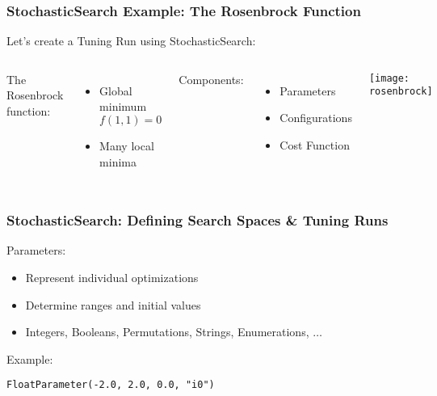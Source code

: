 \documentclass[10pt, compress, aspectratio=169, xcolor=table]{beamer}
\begin{document}
\begin{frame}
    \frametitle{StochasticSearch Example: The Rosenbrock Function}
    Let's create a \alert{Tuning Run} using \alert{StochasticSearch}:
    \begin{columns}[T,onlytextwidth]
        \vspace{1cm}

        The Rosenbrock function:
        \begin{itemize}
            \item \alert{Global minimum} $f(1,1) = 0$
            \item Many \alert{local minima}
        \end{itemize}

        \vspace{.5cm}

        Components:
        \begin{itemize}
            \item \alert{Parameters}
            \item \alert{Configurations}
            \item \alert{Cost Function}
        \end{itemize}

        \begin{center}
            \texttt{[image: rosenbrock]}
        \end{center}
    \end{columns}
\end{frame}

\begin{frame}[fragile]
    \frametitle{StochasticSearch: Defining Search Spaces \& Tuning Runs}
    \alert{Parameters}:
    \begin{itemize}
        \item Represent \alert{individual optimizations}
        \item Determine \alert{ranges} and \alert{initial values}
        \item Integers, Booleans, Permutations, Strings, Enumerations, $\dots$
    \end{itemize}

    \pause

    Example:
    \begin{lstlisting}
FloatParameter(-2.0, 2.0, 0.0, "i0")
    \end{lstlisting}
\end{frame}
\end{document}

